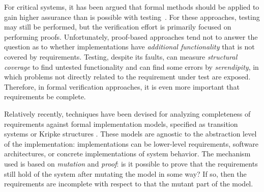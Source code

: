 

For critical systems, it has been argued that formal methods
should be applied to gain higher assurance than is possible with testing~\cite{Miller10:CACM,Rushby09:SEFM,Hardin09:Security}.  For these approaches, testing may still be performed, but the verification effort is primarily focused on performing proofs.  Unfortunately, proof-based approaches tend not to answer the question as to whether implementations have {\em additional functionality} that is not covered by requirements.  Testing, despite its faults, can measure {\em structural coverage} to find untested functionality and can find some errors by {\em serendipity}, in which problems not directly related to the requirement under test are exposed.  Therefore, in formal verification approaches, it is even more important that requirements be complete.

Relatively recently, techniques have been devised for analyzing completeness of requirements against formal implementation models, specified as transition systems or Kripke structures \cite{chockler2001practical,das2005formal, claessen2007coverage, grosse2007estimating}.  These models are agnostic to the abstraction level of the implementation: implementations can be lower-level requirements, software architectures, or concrete implementations of system behavior.  The mechanism used is based on {\em mutation} and {\em proof}: is it possible to prove that the requirements still hold of the system after mutating the model in some way?  If so, then the requirements are incomplete with respect to that the mutant part of the model.

